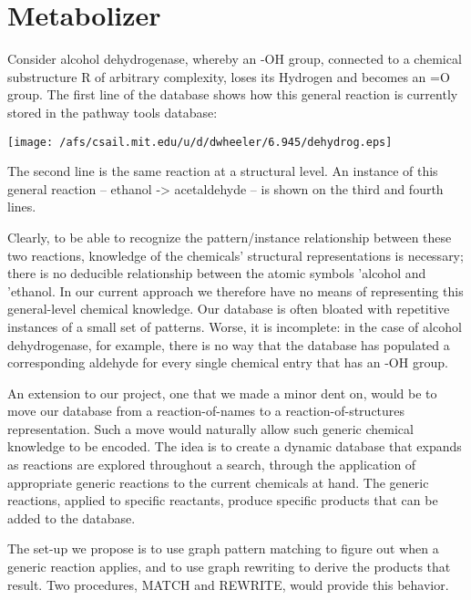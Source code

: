 \section{Metabolizer}

Consider alcohol dehydrogenase, whereby an -OH group, connected to
a chemical substructure R of arbitrary complexity, loses its Hydrogen
and becomes an =O group. The first line of the database shows how
this general reaction is currently stored in the pathway tools database:

\vspace{.1in}

\begin{center}\texttt{[image: /afs/csail.mit.edu/u/d/dwheeler/6.945/dehydrog.eps]}\end{center}

\vspace{.1in}

The second line is the same reaction at a structural level. An instance
of this general reaction -- ethanol -> acetaldehyde -- is shown on
the third and fourth lines.

Clearly, to be able to recognize the pattern/instance relationship
between these two reactions, knowledge of the chemicals' structural
representations is necessary; there is no deducible relationship between
the atomic symbols 'alcohol and 'ethanol. In our current approach
we therefore have no means of representing this general-level chemical
knowledge. Our database is often bloated with repetitive instances
of a small set of patterns. Worse, it is incomplete: in the case of
alcohol dehydrogenase, for example, there is no way that the database
has populated a corresponding aldehyde for every single chemical entry
that has an -OH group.

An extension to our project, one that we made a minor dent on, would
be to move our database from a reaction-of-names to a reaction-of-structures
representation. Such a move would naturally allow such generic chemical
knowledge to be encoded. The idea is to create a dynamic database
that expands as reactions are explored throughout a search, through
the application of appropriate generic reactions to the current chemicals
at hand. The generic reactions, applied to specific reactants, produce
specific products that can be added to the database.

The set-up we propose is to use graph pattern matching to figure out
when a generic reaction applies, and to use graph rewriting to derive
the products that result. Two procedures, MATCH and REWRITE, would
provide this behavior.

